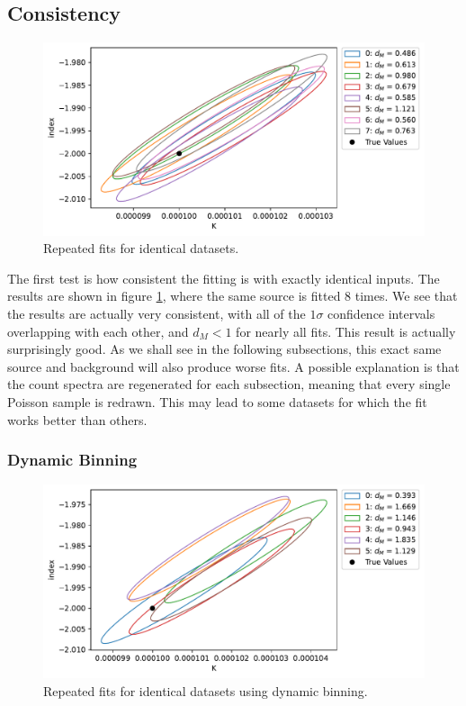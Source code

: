 \documentclass{article}
\begin{document}
\subsection{Consistency}

\begin{figure}[h]
    \centering
    \includegraphics[width=\textwidth]{Images/t_identical_sim_source_sb.pdf}
    \caption{Repeated fits for identical datasets.}
    \label{fig ident}
\end{figure}

The first test is how consistent the fitting is with exactly identical inputs. The results are shown in figure \ref{fig ident}, where the same source is fitted 8 times. We see that the results are actually very consistent, with all of the $1\sigma$ confidence intervals overlapping with each other, and $d_M<1$ for nearly all fits. This result is actually surprisingly good. As we shall see in the following subsections, this exact same source and background will also produce worse fits. A possible explanation is that the count spectra are regenerated for each subsection, meaning that every single Poisson sample is redrawn. This may lead to some datasets for which the fit works better than others. 

\FloatBarrier

\subsubsection{Dynamic Binning}

\begin{figure}[h]
    \centering
    \includegraphics[width=\textwidth]{Images/identical_sim_source_db.pdf}
    \caption{Repeated fits for identical datasets using dynamic binning.}
    \label{fig ident db}
\end{figure}
\end{document}
